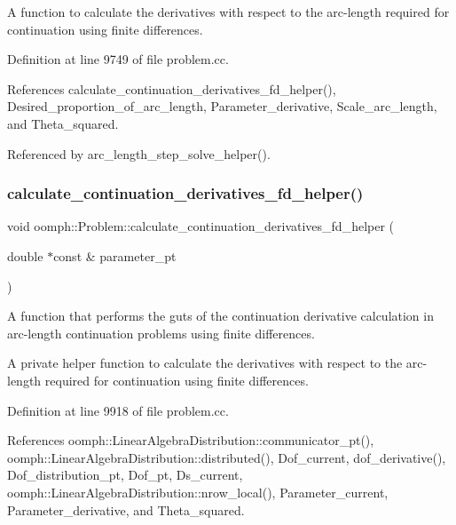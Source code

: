 A function to calculate the derivatives with respect to the arc-\/length required for continuation using finite differences. 

Definition at line 9749 of file problem.\+cc.



References calculate\+\_\+continuation\+\_\+derivatives\+\_\+fd\+\_\+helper(), Desired\+\_\+proportion\+\_\+of\+\_\+arc\+\_\+length, Parameter\+\_\+derivative, Scale\+\_\+arc\+\_\+length, and Theta\+\_\+squared.



Referenced by arc\+\_\+length\+\_\+step\+\_\+solve\+\_\+helper().

\mbox{\label{classoomph_1_1Problem_a668e4c384b0513a943dee9411e640d74}} 
\subsubsection{\texorpdfstring{calculate\+\_\+continuation\+\_\+derivatives\+\_\+fd\+\_\+helper()}{calculate\_continuation\_derivatives\_fd\_helper()}}
{\footnotesize\ttfamily void oomph\+::\+Problem\+::calculate\+\_\+continuation\+\_\+derivatives\+\_\+fd\+\_\+helper (\begin{DoxyParamCaption}\item[{double $\ast$const \&}]{parameter\+\_\+pt }\end{DoxyParamCaption})\hspace{0.3cm}{\ttfamily [private]}}



A function that performs the guts of the continuation derivative calculation in arc-\/length continuation problems using finite differences. 

A private helper function to calculate the derivatives with respect to the arc-\/length required for continuation using finite differences. 

Definition at line 9918 of file problem.\+cc.



References oomph\+::\+Linear\+Algebra\+Distribution\+::communicator\+\_\+pt(), oomph\+::\+Linear\+Algebra\+Distribution\+::distributed(), Dof\+\_\+current, dof\+\_\+derivative(), Dof\+\_\+distribution\+\_\+pt, Dof\+\_\+pt, Ds\+\_\+current, oomph\+::\+Linear\+Algebra\+Distribution\+::nrow\+\_\+local(), Parameter\+\_\+current, Parameter\+\_\+derivative, and Theta\+\_\+squared.



